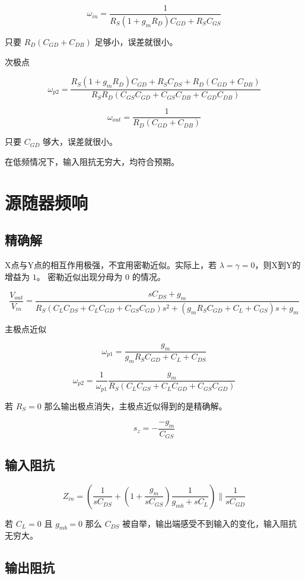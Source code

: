 \documentclass[cn,11pt,chinese,black,simple]{../elegantbook}
\begin{document}
\[\omega_{in} = \frac{1}{R_S(1 + g_m R_D) C_{GD} + R_S C_{GS}}\]

只要 \( R_D(C_{GD} + C_{DB})\) 足够小，误差就很小。

次极点

\[\omega_{p2} = \frac{R_S(1 + g_m R_D)C_{GD} + R_S C_{DS} + R_D(C_{GD} + C_{DB})}{R_S R_D (C_{GS} C_{GD} + C_{GS} C_{DB} + C_{GD} C_{DB})}\]

\[\omega_{out} = \frac{1}{R_D(C_{GD} + C_{DB})}\]

只要 \(C_{GD}\) 够大，误差就很小。

在低频情况下，输入阻抗无穷大，均符合预期。

\section{源随器频响}

\subsection{精确解}

X点与Y点的相互作用极强，不宜用密勒近似。实际上，若 \(\lambda = \gamma = 0\)，则X到Y的增益为 \(1\)。 密勒近似出现分母为 \(0\) 的情况。


\[\frac{V_{out}}{V_{in}} = \frac{s C_{DS} + g_m}{R_S (C_L C_{DS} + C_L C_{GD} + C_{GS} C_{GD})s^2 + (g_m R_S C_{GD} + C_L + C_{GS}) s + g_m }\]

主极点近似

\[\omega_{p1} = \frac{g_m}{g_m R_S C_{GD} + C_L +C_{DS}}\]

\[\omega_{p2} = \frac{1}{\omega_{p1}} \frac{g_m}{R_S (C_L C_{GS} + C_L C_{GD} + C_{GS} C_{GD})}\]

若 \(R_S = 0\) 那么输出极点消失，主极点近似得到的是精确解。

\[s_z = -\frac{-g_m}{C_{GS}}\]

\subsection{输入阻抗}

\[Z_{in} = (\frac{1}{s C_{DS}} + (1 + \frac{g_m}{s C_{GS}})\frac{1}{g_{mb} + s C_L}) \| \frac{1}{s C_{GD}} \]

若 \(C_L = 0\) 且 \(g_{mb} = 0\) 那么 \(C_{DS}\)  被自举，输出端感受不到输入的变化，输入阻抗无穷大。

\subsection{输出阻抗}
\end{document}
